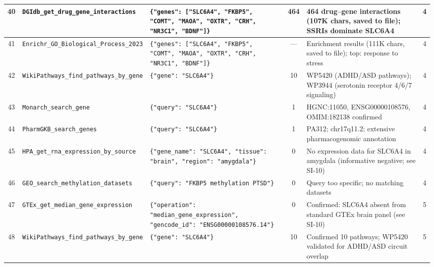 \begin{longtable}{@{}c p{2.6cm} p{5.2cm} c p{3.8cm} c@{}}
40 &
\texttt{DGIdb\_get\_\allowbreak drug\_gene\_\allowbreak interactions} &
\texttt{\{"genes": ["SLC6A4", "FKBP5", "COMT", "MAOA", "OXTR", "CRH", "NR3C1", "BDNF"]\}} &
464 &
464 drug--gene interactions (107K chars, saved to file); SSRIs dominate SLC6A4 &
4 \\
\midrule

41 &
\texttt{Enrichr\allowbreak \_GO\_Biological\_\allowbreak Process\_2023} &
\texttt{\{"genes": ["SLC6A4", "FKBP5", "COMT", "MAOA", "OXTR", "CRH", "NR3C1", "BDNF"]\}} &
--- &
Enrichment results (111K chars, saved to file); top: response to stress &
4 \\
\midrule

42 &
\texttt{WikiPathways\_\allowbreak find\_pathways\_\allowbreak by\_gene} &
\texttt{\{"gene": "SLC6A4"\}} &
10 &
WP5420 (ADHD/ASD pathways); WP3944 (serotonin receptor 4/6/7 signaling) &
4 \\
\midrule

43 &
\texttt{Monarch\_\allowbreak search\_gene} &
\texttt{\{"query": "SLC6A4"\}} &
1 &
HGNC:11050, ENSG00000108576, OMIM:182138 confirmed &
4 \\
\midrule

44 &
\texttt{PharmGKB\_\allowbreak search\_genes} &
\texttt{\{"query": "SLC6A4"\}} &
1 &
PA312; chr17q11.2; extensive pharmacogenomic annotation &
4 \\
\midrule

45 &
\texttt{HPA\_get\_rna\_\allowbreak expression\_\allowbreak by\_source} &
\texttt{\{"gene\_name": "SLC6A4", "tissue": "brain", "region": "amygdala"\}} &
0 &
No expression data for SLC6A4 in amygdala (informative negative; see SI-10) &
4 \\
\midrule

46 &
\texttt{GEO\_search\_\allowbreak methylation\_\allowbreak datasets} &
\texttt{\{"query": "FKBP5 methylation PTSD"\}} &
0 &
Query too specific; no matching datasets &
4 \\

\midrule


47 &
\texttt{GTEx\_get\_\allowbreak median\_gene\_\allowbreak expression} &
\texttt{\{"operation": "median\_gene\_expression", "gencode\_id": "ENSG00000108576.14"\}} &
0 &
Confirmed: SLC6A4 absent from standard GTEx brain panel (see SI-10) &
5 \\
\midrule

48 &
\texttt{WikiPathways\_\allowbreak find\_pathways\_\allowbreak by\_gene} &
\texttt{\{"gene": "SLC6A4"\}} &
10 &
Confirmed 10 pathways; WP5420 validated for ADHD/ASD circuit overlap &
5 \\
\midrule


\end{longtable}
